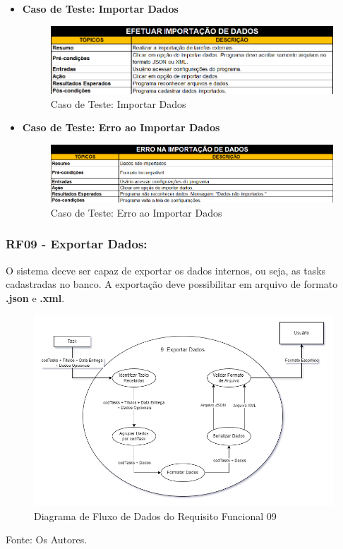 \documentclass[a4paper,12pt]{article}
\begin{document}
\pagebreak
\begin{itemize}
	\item\textbf{Caso de Teste: Importar Dados}
	\begin{figure}[H]
		\centering
		\includegraphics[scale=0.65]{UnitTest/trueCase/importData.png}
		\caption{Caso de Teste: Importar Dados}
	\end{figure}

	\item\textbf{Caso de Teste: Erro ao Importar Dados}
	\begin{figure}[H]
		\centering
		\includegraphics[scale=0.65]{UnitTest/falseCase/importData.png}
		\caption{Caso de Teste: Erro ao Importar Dados}
	\end{figure}
\end{itemize}

\pagebreak

\subsubsection{RF09 - Exportar Dados:}
O sistema decve ser capaz de exportar os dados internos, ou seja, as tasks cadastradas no banco. A exportação deve possibilitar 
em arquivo de formato \textbf{.json} e \textbf{.xml}.
\begin{figure}[H]
	\centering
	\includegraphics[scale=0.45]{DFDs/RF09.drawio.png}
	\caption{Diagrama de Fluxo de Dados do Requisito Funcional 09}
\end{figure}
\noindent Fonte: Os Autores.
\end{document}
